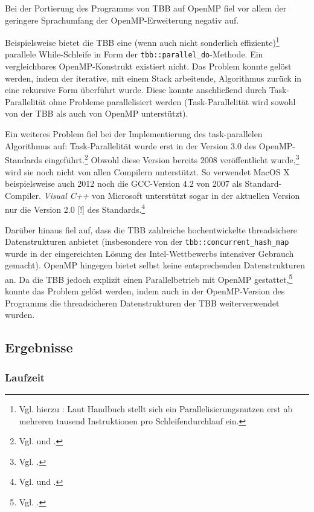 \documentclass[11pt]{scrartcl}
\begin{document}
Bei der Portierung des Programms von TBB auf OpenMP fiel vor allem der geringere Sprachumfang der OpenMP-Erweiterung
negativ auf.

Beispielsweise bietet die TBB eine (wenn auch nicht sonderlich effiziente)\footnote{Vgl. hierzu \cite{intel_cook_2012}:
Laut Handbuch stellt sich ein Parallelisierungsnutzen erst ab mehreren tausend Instruktionen pro Schleifendurchlauf
ein.} parallele While-Schleife in Form der \texttt{tbb::parallel\_do}-Methode. Ein vergleichbares OpenMP-Konstrukt
existiert nicht. Das Problem konnte gelöst werden, indem der iterative, mit einem Stack arbeitende, Algorithmus zurück
in eine rekursive Form überführt wurde. Diese konnte anschließend durch Task-Parallelität ohne Probleme parallelisiert
werden (Task-Parallelität wird sowohl von der TBB als auch von OpenMP unterstützt).

Ein weiteres Problem fiel bei der Implementierung des task-parallelen Algorithmus auf: Task-Parallelität wurde erst in
der Version 3.0 des OpenMP-Standards eingeführt.\footnote{Vgl. \cite[S.~134]{openmp08} und
\cite[S.~406ff]{ayguade_design_2009}.} Obwohl diese Version bereits 2008 veröffentlicht wurde,\footnote{Vgl.
\cite{openmp.org_openmp_2012}.} wird sie noch nicht von allen Compilern unterstützt. So verwendet MacOS X
beispielsweise auch 2012 noch die GCC-Version 4.2 von 2007 als Standard-Compiler. \emph{Visual C++} von Microsoft
unterstützt sogar in der aktuellen Version nur die Version 2.0 [!] des Standards.\footnote{Vgl.
\cite{openmp.org_openmp_2012-2} und
\cite{microsoft_openmp_2012}.}

Darüber hinaus fiel auf, dass die TBB zahlreiche hochentwickelte threadsichere Datenstrukturen anbietet (insbesondere
von der \texttt{tbb::concurrent\_hash\_map} wurde in der eingereichten Lösung des Intel-Wettbewerbs intensiver Gebrauch
gemacht). OpenMP hingegen bietet selbst keine entsprechenden Datenstrukturen an. Da die TBB jedoch explizit einen
Parallelbetrieb mit OpenMP gestattet,\footnote{Vgl. \cite{intel_mixing_2012}.} konnte das Problem gelöst werden, indem
auch in der OpenMP-Version des Programms die threadsicheren Datenstrukturen der TBB weiterverwendet wurden.

\subsection{Ergebnisse}

\subsubsection{Laufzeit}
\end{document}
